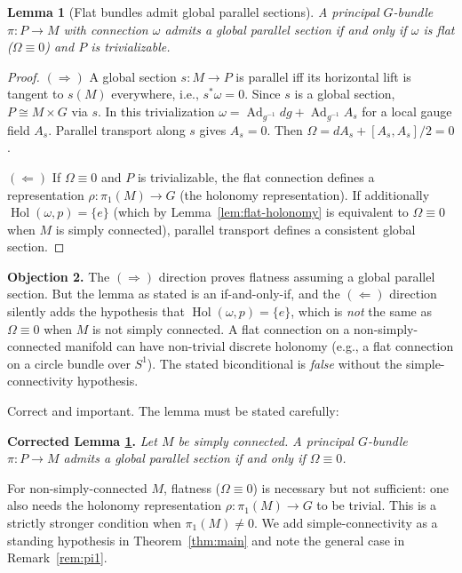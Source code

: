 \documentclass[12pt]{amsart}
\theoremstyle{plain}
\newtheorem{lemma}[theorem]{Lemma}
\theoremstyle{definition}
\DeclareMathOperator{\Hol}{Hol}
\DeclareMathOperator{\Ad}{Ad}
\begin{document}
\begin{lemma}[Flat bundles admit global parallel sections]
\label{lem:flat-section}
A principal $G$-bundle $\pi: P \to M$ with connection $\omega$ admits a
global parallel section if and only if $\omega$ is flat ($\Omega \equiv 0$)
and $P$ is trivializable.
\end{lemma}

\begin{proof}
$(\Rightarrow)$ A global section $s: M \to P$ is parallel iff its horizontal
lift is tangent to $s(M)$ everywhere, i.e., $s^*\omega = 0$. Since $s$ is a
global section, $P \cong M \times G$ via $s$. In this trivialization $\omega
= \Ad_{g^{-1}} dg + \Ad_{g^{-1}} A_s$ for a local gauge field $A_s$.
Parallel transport along $s$ gives $A_s = 0$. Then $\Omega = dA_s +
[A_s,A_s]/2 = 0$.

$(\Leftarrow)$ If $\Omega \equiv 0$ and $P$ is trivializable, the flat
connection defines a representation $\rho: \pi_1(M) \to G$ (the holonomy
representation). If additionally $\Hol(\omega,p) = \{e\}$ (which by
Lemma~\ref{lem:flat-holonomy} is equivalent to $\Omega \equiv 0$ when $M$
is simply connected), parallel transport defines a consistent global section.
\end{proof}

\begin{auditbox}
\textbf{Objection 2.} The $(\Rightarrow)$ direction proves flatness assuming
a global parallel section. But the lemma as stated is an if-and-only-if, and
the $(\Leftarrow)$ direction silently adds the hypothesis that
$\Hol(\omega,p) = \{e\}$, which is \emph{not} the same as $\Omega \equiv 0$
when $M$ is not simply connected. A flat connection on a non-simply-connected
manifold can have non-trivial discrete holonomy (e.g., a flat connection on a
circle bundle over $S^1$). The stated biconditional is \emph{false} without
the simple-connectivity hypothesis.
\end{auditbox}

\begin{replybox}
Correct and important. The lemma must be stated carefully:

\textbf{Corrected Lemma \ref{lem:flat-section}.}
\emph{Let $M$ be simply connected. A principal $G$-bundle $\pi: P \to M$
admits a global parallel section if and only if $\Omega \equiv 0$.}

For non-simply-connected $M$, flatness ($\Omega \equiv 0$) is necessary but
not sufficient: one also needs the holonomy representation $\rho: \pi_1(M)
\to G$ to be trivial. This is a strictly stronger condition when $\pi_1(M)
\neq 0$. We add simple-connectivity as a standing hypothesis in
Theorem~\ref{thm:main} and note the general case in Remark~\ref{rem:pi1}.
\end{replybox}
\end{document}

